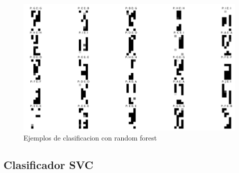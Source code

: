 \documentclass[8pt,a4paper]{article}
\begin{document}
\begin{enumerate}
\begin{figure}[h!]
\centering
    \includegraphics[scale=0.15]{./RandomForest_9_4.png}
    \caption{Ejemplos de clasificacion con random forest}
\end{figure}
\end{enumerate}

\subsection{Clasificador SVC}
\end{document}
